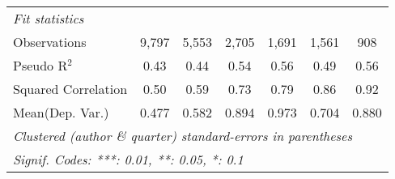 \begin{tabular}{lcccccc}
   \midrule
   \emph{Fit statistics}\\
   Observations                                               & 9,797   & 5,553       & 2,705         & 1,691      & 1,561        & 908\\  
   Pseudo R$^2$                                               & 0.43    & 0.44        & 0.54          & 0.56       & 0.49         & 0.56\\  
   Squared Correlation                                        & 0.50    & 0.59        & 0.73          & 0.79       & 0.86         & 0.92\\  
Mean(Dep. Var.) & 0.477 & 0.582 & 0.894 & 0.973 & 0.704 & 0.880 \\
   \midrule \midrule
   \multicolumn{7}{l}{\emph{Clustered (author \& quarter) standard-errors in parentheses}}\\
   \multicolumn{7}{l}{\emph{Signif. Codes: ***: 0.01, **: 0.05, *: 0.1}}\\
\end{tabular}
\par\endgroup
